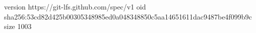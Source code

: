 version https://git-lfs.github.com/spec/v1
oid sha256:53cd82d425b00305348985ed0a048348850c5aa14651611dac9487be4f099b9c
size 1003
